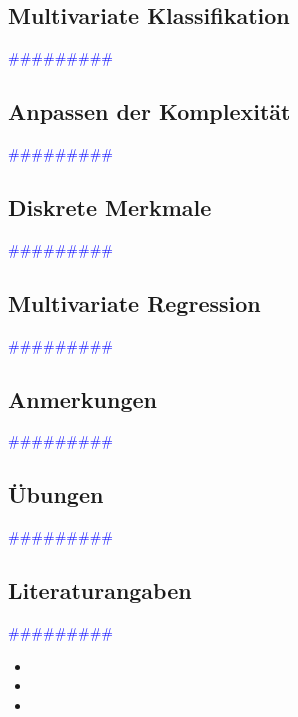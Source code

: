 \documentclass{article}
\begin{document}
  \subsection{Multivariate Klassifikation} %
      \textcolor{blue}{\#\#\#\#\#\#\#\#\#}
  \subsection{Anpassen der Komplexität} %
      \textcolor{blue}{\#\#\#\#\#\#\#\#\#}
  \subsection{Diskrete Merkmale} %
      \textcolor{blue}{\#\#\#\#\#\#\#\#\#}
  \subsection{Multivariate Regression} %
      \textcolor{blue}{\#\#\#\#\#\#\#\#\#}
  \subsection{Anmerkungen} %
      \textcolor{blue}{\#\#\#\#\#\#\#\#\#}
  \subsection{Übungen} %
      \textcolor{blue}{\#\#\#\#\#\#\#\#\#}
  \subsection{Literaturangaben} %
      \textcolor{blue}{\#\#\#\#\#\#\#\#\#}

      \begin{itemize}
      \color{red}
        \item 
        \item
        \item
      \end{itemize}
\end{document}

